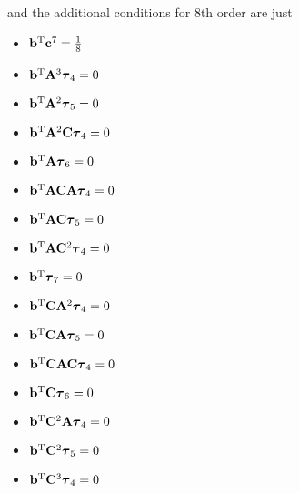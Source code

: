 and the additional conditions for 8th order are just
\begin{itemize}
  \item $\bb\transpose \bc^7 = \frac{1}{8}$
  \item $\bb\transpose \mA^3\ste_4 = 0$
  \item $\bb\transpose \mA^2\ste_5 = 0$
  \item $\bb\transpose \mA^2\mC\ste_4 = 0$
  \item $\bb\transpose \mA\ste_6 = 0$
  \item $\bb\transpose \mA\mC\mA\ste_4 = 0$
  \item $\bb\transpose \mA\mC\ste_5 = 0$
  \item $\bb\transpose \mA\mC^2\ste_4 = 0$
  \item $\bb\transpose \ste_7 = 0$
  \item $\bb\transpose \mC\mA^2\ste_4 = 0$
  \item $\bb\transpose \mC\mA\ste_5 = 0$
  \item $\bb\transpose \mC\mA\mC\ste_4 = 0$
  \item $\bb\transpose \mC\ste_6 = 0$
  \item $\bb\transpose \mC^2\mA\ste_4 = 0$
  \item $\bb\transpose \mC^2\ste_5 = 0$
  \item $\bb\transpose \mC^3\ste_4 = 0$
\end{itemize}


